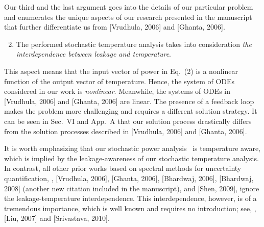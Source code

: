 \begin{authors}
Our third and the last argument goes into the details of our particular problem and enumerates the unique aspects of our research presented in the manuscript that further differentiate us from [Vrudhula, 2006] and [Ghanta, 2006].
\begin{enumerate}
  \setcounter{enumi}{1}
  \item The performed stochastic temperature analysis takes into consideration \emph{the interdependence between leakage and temperature}.
\end{enumerate}
This aspect means that the input vector of power in Eq.~(2) is a nonlinear function of the output vector of temperature.
Hence, the system of ODEs considered in our work is \emph{nonlinear}.
Meanwhile, the systems of ODEs in [Vrudhula, 2006] and [Ghanta, 2006] are linear.
The presence of a feedback loop makes the problem more challenging and requires a different solution strategy.
It can be seen in Sec.~VI and App.~A that our solution process drastically differs from the solution processes described in [Vrudhula, 2006] and [Ghanta, 2006].

It is worth emphasizing that our stochastic power analysis \perse\ is temperature aware, which is implied by the leakage-awareness of our stochastic temperature analysis.
In contrast, all other prior works based on spectral methods for uncertainty quantification, \ie, [Vrudhula, 2006], [Ghanta, 2006], [Bhardwaj, 2006], [Bhardwaj, 2008] (another new citation included in the manuscript), and [Shen, 2009], ignore the leakage-temperature interdependence.
This interdependence, however, is of a tremendous importance, which is well known and requires no introduction; see, \eg, [Liu, 2007] and [Srivastava, 2010].


\end{authors}
